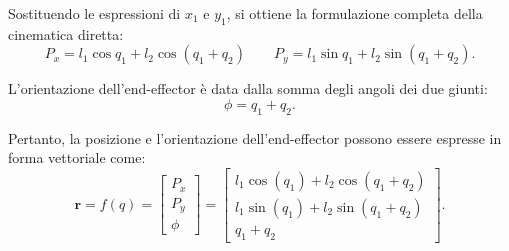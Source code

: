 ﻿\documentclass[11pt, a4paper]{article}
\begin{document}
Sostituendo le espressioni di \( x_1 \) e \( y_1 \), si ottiene la formulazione completa della cinematica diretta:
\[
    P_x = l_1 \cos q_1 + l_2 \cos (q_1 + q_2) \qquad
    P_y = l_1 \sin q_1 + l_2 \sin (q_1 + q_2).
\]

L'orientazione dell'end-effector è data dalla somma degli angoli dei due giunti:
\[
    \phi = q_1 + q_2.
\]

Pertanto, la posizione e l'orientazione dell'end-effector possono essere espresse in forma vettoriale come:
\[
    \mathbf{r} = f(q) =
    \begin{bmatrix}
        P_x \\
        P_y \\
        \phi
    \end{bmatrix}
    =
    \begin{bmatrix}
        l_1 \cos(q_1) + l_2 \cos (q_1 + q_2) \\
        l_1 \sin(q_1) + l_2 \sin (q_1 + q_2) \\
        q_1 + q_2
    \end{bmatrix}.
\]

\newpage
\end{document}
